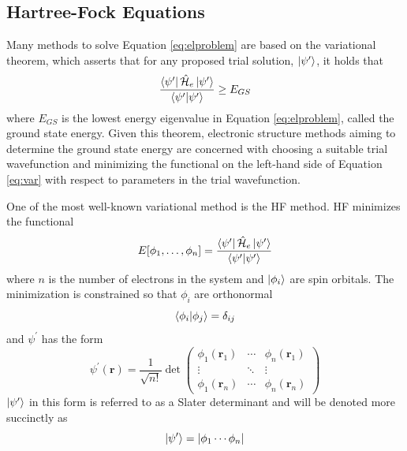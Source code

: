 \documentclass[final,3p,times,twocolumn]{elsarticle}
\newcommand{\ham}{\hat{\mathcal{H}}}
\begin{document}
\subsection{Hartree-Fock Equations} \label{sec:hf}
Many methods to solve Equation \eqref{eq:elproblem} are based on the variational theorem, which asserts that for any proposed trial solution, $\ket{\psi^\prime}$, it holds that
\begin{equation} \label{eq:var}
\frac{\bra{\psi^\prime}\ham_e\ket{\psi^\prime}}{\bra{\psi^\prime}\ket{\psi^\prime}} \geq E_{GS}
\end{equation}
where $E_{GS}$ is the lowest energy eigenvalue in Equation \eqref{eq:elproblem}, called the ground state energy. Given this theorem, electronic structure methods aiming to determine the ground state energy are concerned with choosing a suitable trial wavefunction and minimizing the functional on the left-hand side of Equation \eqref{eq:var} with respect to parameters in the trial wavefunction. 

One of the most well-known variational method is the HF method.\cite{hartree,fock,roothaan} HF minimizes the functional
\begin{equation} \label{eq:hffunc}
E[\phi_1, \ldots, \phi_n] = \dfrac{\bra{\psi^\prime}\ham_e\ket{\psi^\prime}}{\bra{\psi^\prime}\ket{\psi^\prime}}
\end{equation}
where $n$ is the number of electrons in the system and $\ket{\phi_i}$ are spin orbitals. The minimization is constrained so that $\phi_i$ are orthonormal
\begin{equation}
\bra{\phi_i}\ket{\phi_j} = \delta_{ij}
\end{equation}
and $\psi^\prime$ has the form
\begin{equation} \label{eq:det}
\psi^\prime(\mathbf{r}) = \dfrac{1}{\sqrt{n!}}\det\begin{pmatrix} \phi_1(\mathbf{r}_1) & \cdots & \phi_n(\mathbf{r}_1) \\ \vdots & \ddots & \vdots \\
\phi_1(\mathbf{r}_n) & \cdots & \phi_n(\mathbf{r}_n) \end{pmatrix}
\end{equation}
$\ket{\psi^\prime}$ in this form is referred to as a Slater determinant\cite{slater} and will be denoted more succinctly as
\begin{equation}
\ket{\psi^\prime} = |\phi_1 \cdots \phi_n|
\end{equation}
\end{document}
